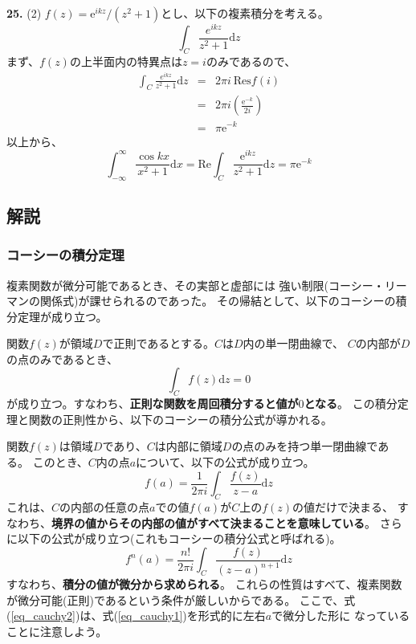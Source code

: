 \documentclass{jarticle}
\newcommand{\diff}{\mathrm d}
\newcommand{\ans}[2]{\noindent\\ {\bf \large #1.} (#2)}
\newcommand{\e}{\mathrm e}
\begin{document}
\ans{25}{2}
$f(z) = \e^{ikz}/(z^2+1)$とし、以下の複素積分を考える。
\begin{equation}
  \int_C \frac{e^{ikz}}{z^2+1} \diff z
\end{equation}
まず、$f(z)$の上半面内の特異点は$z=i$のみであるので、
\begin{eqnarray}
  \int_C \frac{e^{ikz}}{z^2+1} \diff z &=& 2\pi i ~\mbox{Res} f(i)\\
  &=& 2\pi i \left( \frac{\e^{-k}}{2i} \right) \\
  &=& \pi \e^{-k}
\end{eqnarray}
以上から、
\begin{equation}
  \int_{-\infty}^{\infty} \frac{\cos kx}{x^2+1} \diff x =
  \mbox{Re} \int_C \frac{\e^{ikz}}{z^2+1} \diff z = \pi \e^{-k}
\end{equation}

\subsection{解説}

\subsubsection{コーシーの積分定理}

複素関数が微分可能であるとき、その実部と虚部には
強い制限(コーシー・リーマンの関係式)が課せられるのであった。
その帰結として、以下のコーシーの積分定理が成り立つ。

関数$f(z)$が領域$D$で正則であるとする。$C$は$D$内の単一閉曲線で、
$C$の内部が$D$の点のみであるとき、
\begin{equation}
  \int_C f(z) \diff z = 0
\end{equation}
が成り立つ。すなわち、{\bf 正則な関数を周回積分すると値が$0$となる}。
この積分定理と関数の正則性から、以下のコーシーの積分公式が導かれる。

関数$f(z)$は領域$D$であり、$C$は内部に領域$D$の点のみを持つ単一閉曲線である。
このとき、$C$内の点$a$について、以下の公式が成り立つ。
\begin{equation}
  f(a) = \frac{1}{2\pi i} \int_C \frac{f(z)}{z-a} \diff z \label{eq_cauchy1}
\end{equation}
これは、$C$の内部の任意の点$a$での値$f(a)$が$C$上の$f(z)$の値だけで決まる、
すなわち、{\bf 境界の値からその内部の値がすべて決まることを意味している}。
さらに以下の公式が成り立つ(これもコーシーの積分公式と呼ばれる)。
\begin{equation}
  f^{n}(a) = \frac{n!}{2\pi i} \int_C \frac{f(z)}{(z-a)^{n+1}} \diff z  \label{eq_cauchy2}
\end{equation}
すなわち、{\bf 積分の値が微分から求められる}。
これらの性質はすべて、複素関数が微分可能(正則)であるという条件が厳しいからである。
ここで、式(\ref{eq_cauchy2})は、式(\ref{eq_cauchy1})を形式的に左右$a$で微分した形に
なっていることに注意しよう。
\end{document}
